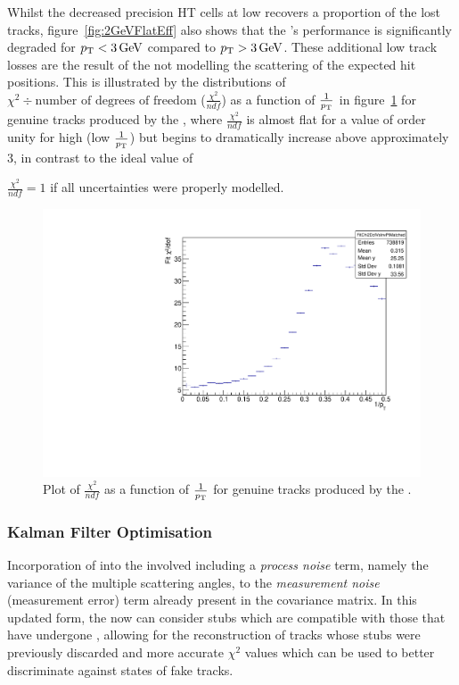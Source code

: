 Whilst the decreased precision HT cells at low \pT recovers a proportion of the lost tracks, figure~\ref{fig:2GeVFlatEff}  also shows that the \KF's performance is significantly degraded for $p_{\mathrm{T}} < 3 \,\text{Ge\hspace{-.08em}V}$ compared to $p_{\mathrm{T}} > 3 \,\text{Ge\hspace{-.08em}V}$.
These additional low \pT track losses are the result of the \KF not modelling the scattering of the expected hit positions.
This is illustrated by the distributions of $\chi^{2} \div \text{number of degrees of freedom}$ ($\frac{\chi^{2}}{ndf}$) as a function of $\frac{1}{p_{\mathrm{T}}}$ in figure~\ref{fig:2GeVFlatChi2Ndf} for genuine tracks produced by the \KF, where $\frac{\chi^{2}}{ndf}$ is almost flat for a value of order unity for high \pT (low $\frac{1}{p_{\mathrm{T}}}$) but begins to dramatically increase above approximately 3\GeV, in contrast to the ideal value of {$\frac{\chi^{2}}{ndf} = 1$ if all uncertainties were properly modelled.

\begin{figure}[tbp]
\centering
\includegraphics[width=\textwidth]{figs/tk-upgrade/results-lowPtTracking/kfChi2NdfVsInvPtFlatGeometry_5000.pdf}
\caption{Plot of $\frac{\chi^{2}}{ndf}$ as a function of $\frac{1}{p_{\mathrm{T}}}$ for genuine tracks produced by the \KF.}
\label{fig:2GeVFlatChi2Ndf}
\end{figure}

\subsubsection{Kalman Filter Optimisation}\label{subsubsec:lowPtOptKF}
Incorporation of \MS into the \KF involved including a \emph{process noise} term, namely the variance of the multiple scattering angles, to the \emph{measurement noise} (\ie measurement error) term already present in the \KF covariance matrix.
In this updated form, the \KF now can consider stubs which are compatible with those that have undergone \MS, allowing for the reconstruction of tracks whose stubs were previously discarded and more accurate $\chi^{2}$ values which can be used to better discriminate against states of fake tracks.

}
